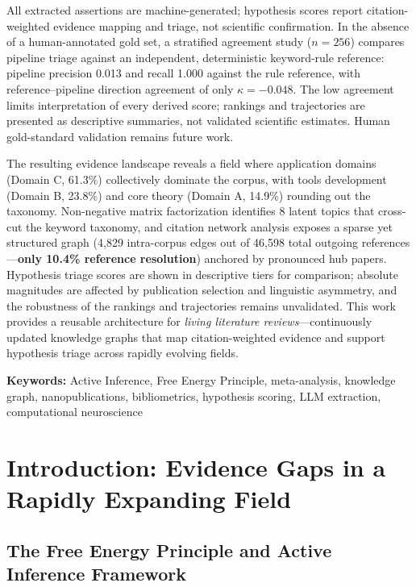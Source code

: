 \documentclass[
  english,
]{article}
\begin{document}
All extracted assertions are machine-generated; hypothesis scores report
citation-weighted evidence mapping and triage, not scientific
confirmation. In the absence of a human-annotated gold set, a stratified
agreement study (\(n = 256\)) compares pipeline triage against an
independent, deterministic keyword-rule reference: pipeline precision
0.013 and recall 1.000 against the rule reference, with
reference--pipeline direction agreement of only \(\kappa = -0.048\). The
low agreement limits interpretation of every derived score; rankings and
trajectories are presented as descriptive summaries, not validated
scientific estimates. Human gold-standard validation remains future
work.

The resulting evidence landscape reveals a field where application
domains (Domain C, 61.3\%) collectively dominate the corpus, with tools
development (Domain B, 23.8\%) and core theory (Domain A, 14.9\%)
rounding out the taxonomy. Non-negative matrix factorization identifies
8 latent topics that cross-cut the keyword taxonomy, and citation
network analysis exposes a sparse yet structured graph (4,829
intra-corpus edges out of 46,598 total outgoing
references---\textbf{only 10.4\% reference resolution}) anchored by
pronounced hub papers. Hypothesis triage scores are shown in descriptive
tiers for comparison; absolute magnitudes are affected by publication
selection and linguistic asymmetry, and the robustness of the rankings
and trajectories remains unvalidated. This work provides a reusable
architecture for \emph{living literature reviews}---continuously updated
knowledge graphs that map citation-weighted evidence and support
hypothesis triage across rapidly evolving fields.

\textbf{Keywords:} Active Inference, Free Energy Principle,
meta-analysis, knowledge graph, nanopublications, bibliometrics,
hypothesis scoring, LLM extraction, computational neuroscience

\newpage

\section{Introduction: Evidence Gaps in a Rapidly Expanding
Field}\label{introduction-evidence-gaps-in-a-rapidly-expanding-field}

\subsection{The Free Energy Principle and Active Inference
Framework}\label{the-free-energy-principle-and-active-inference-framework}
\end{document}
